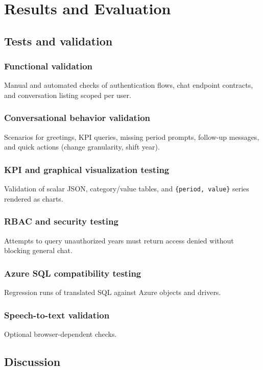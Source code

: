 \chapter{Results and Evaluation}

\section{Tests and validation}
\subsection{Functional validation}
Manual and automated checks of authentication flows, chat endpoint contracts, and conversation listing scoped per user.

\subsection{Conversational behavior validation}
Scenarios for greetings, KPI queries, missing period prompts, follow-up messages, and quick actions (change granularity, shift year).

\subsection{KPI and graphical visualization testing}
Validation of scalar JSON, category/value tables, and \texttt{\{period, value\}} series rendered as charts.

\subsection{RBAC and security testing}
Attempts to query unauthorized years must return access denied without blocking general chat.

\subsection{Azure SQL compatibility testing}
Regression runs of translated SQL against Azure objects and drivers.

\subsection{Speech-to-text validation}
Optional browser-dependent checks.

\section{Discussion}
